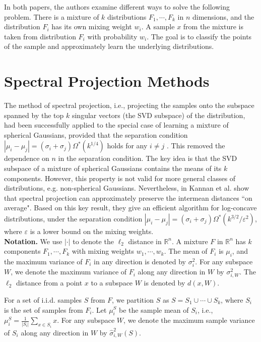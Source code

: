 \documentclass[11pt,letter]{article}
\begin{document}
In both papers, the authors examine different ways to solve the following problem. There is a mixture of $k$ distributions $F_1, \cdots, F_k$ in $n$ dimensions, and the distribution $F_i$ has its own mixing weight $w_i$. A sample $x$ from the mixture is taken from distribution $F_i$ with probability $w_i$. The goal is to classify the points of the sample and approximately learn the underlying distributions.

\section{Spectral Projection Methods}


The method of spectral projection, i.e., projecting the samples onto the subspace spanned by the top $k$ singular vectors (the SVD subspace) of the distribution, had been successfully applied to the special case of learning a mixture of spherical Gaussians, provided that the separation condition $|\mu_i - \mu_j| = (\sigma_i + \sigma_j) \Omega^*(k^{1/4})$ holds for any $i\not=j$ \cite{Vempala02aspectral}. This removed the dependence on $n$ in the separation condition. The key idea is that the SVD subspace of a mixture of spherical Gaussians contains the means of its $k$ components. However, this property is not valid for more general classes of distributions, e.g. non-spherical Gaussians.
Nevertheless, in \cite{Kannan08spectral} Kannan et al. show that spectral projection can approximately preserve the intermean distances ``on average". Based on this key result, they give an efficient algorithm for log-concave distributions, under the separation condition $|\mu_i - \mu_j| = (\sigma_i + \sigma_j) \Omega^*(k^{3/2}/\varepsilon^2)$, where $\varepsilon$ is a lower bound on the mixing weights.\\

\noindent\textbf{Notation.}
We use $|\cdot|$ to denote the $\ell_2$ distance in $\mathbb R^n$.
A mixture $F$ in $\mathbb R^n$ has $k$ components $F_1, \cdots, F_k$ with mixing weights $w_1, \cdots, w_k$. The mean of $F_i$ is $\mu_i$, and the maximum variance of $F_i$ in any direction is denoted by $\sigma_i^2$. For any subspace $W$, we denote the maximum variance of $F_i$ along any direction in $W$ by $\sigma_{i, W}^2$.
The $\ell_2$ distance from a point $x$ to a subspace $W$ is denoted by $d(x, W)$.

For a set of i.i.d. samples $S$ from $F$, we partition $S$ as $S = S_1 \cup \cdots \cup S_k$, where $S_i$ is the set of samples from $F_i$. Let $\mu_i^S$ be the sample mean of $S_i$, i.e.,
$\mu_i^S = \frac{1}{|S_i|} \sum_{x\in S_i} x$.
For any subspace $W$, we denote the maximum sample variance of $S_i$ along any direction in $W$ by $\hat \sigma_{i, W}^2(S)$.
\end{document}
